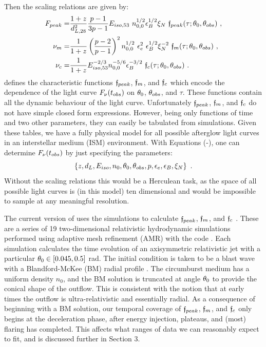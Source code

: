 Then the scaling relations are given by:
\begin{align} \eqlabel{scaling}
	\Fp =& \frac{1+z}{\ddl^2}\frac{p-1}{3p-1} \Edl \  \ndl^{1/2} \epsB^{1/2} \xN \ \cfp(\tau; \thO, \thobs) \ , \nonumber \\
	\nu_m =& \frac{1}{1+z}\left(\frac{p-2}{p-1}\right)^2   \ndl^{1/2} \ \epse^2 \ \epsB^{1/2} \xN^{-2} \ \cfm(\tau; \thO, \thobs) \ , \nonumber \\
	\nu_c =& \frac{1}{1+z} \Edl^{-2/3}  \ndl^{-5/6} \epsB^{-3/2} \ \cfc(\tau; \thO, \thobs) \ .  
\end{align}
 defines the characteristic functions $\mathfrak{f}_{peak}$, $\mathfrak{f}_{m}$, and $\mathfrak{f}_{c}$ which encode the dependence of the light curve $F_\nu(t_{obs})$ on $\theta_0$, $\theta_{obs}$, and $\tau$.  These functions contain all the dynamic behaviour of the light curve.  Unfortunately $\mathfrak{f}_{peak}$, $\mathfrak{f}_{m}$, and $\mathfrak{f}_{c}$ do not have simple closed form expressions.  However, being only functions of time and two other parameters, they can easily be tabulated from simulations.  Given these tables, we have a fully physical model for all possible afterglow light curves in an interstellar medium (ISM) environment.  With Equations (-), one can determine $F_\nu(t_{obs})$ by just specifying the parameters:
\begin{equation}
	\left \{  z, d_L, \Eiso, n_0, \thO, \thobs, p, \epse, \epsB, \xN \right \} \ .
\end{equation}
Without the scaling relations  this would be a Herculean task, as the space of all possible light curves is (in this model) ten dimensional and would be impossible to sample at any meaningful resolution.

The current version of \scalefit{} uses the \boxfit{} simulations to calculate $\mathfrak{f}_{peak}$, $\mathfrak{f}_{m}$, and $\mathfrak{f}_{c}$ \citep{vanEer12boxfit}.  These are a series of 19 two-dimensional relativistic hydrodynamic simulations performed using adaptive mesh refinement (AMR) with the \ramcode{} code \citep{Zhang06, Zhang09}.  Each simulation calculates the time evolution of an axisymmetric relativistic jet with a particular $\theta_0 \in [0.045, 0.5]$ rad.  The initial condition is taken to be a blast wave with a Blandford-McKee (BM) radial profile \citep{Blandford76}.  The circumburst medium has a uniform density $n_0$, and the BM solution is truncated at angle $\theta_0$ to provide the conical shape of the outflow.  This is consistent with the notion that at early times the outflow is ultra-relativistic and essentially radial.  As a consequence of beginning with a BM solution, our temporal coverage of $\mathfrak{f}_{peak}$, $\mathfrak{f}_{m}$, and $\mathfrak{f}_{c}$ only begins at the deceleration phase, after energy injection, plateaus, and (most) flaring has completed.  This affects what ranges of data we can reasonably expect to fit, and is discussed further in Section 3. 

